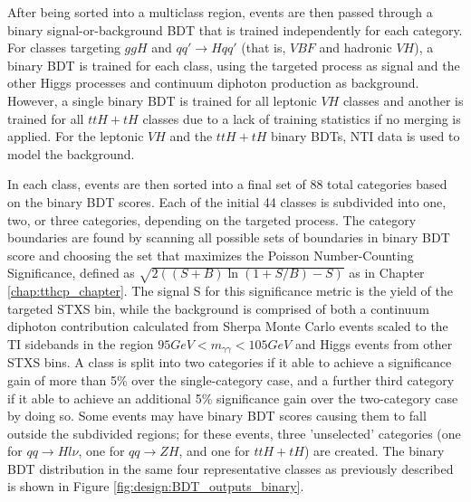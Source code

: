 After being sorted into a multiclass region, events are then passed through a binary signal-or-background BDT that is trained independently for each category. For classes targeting $ggH$ and $qq' \rightarrow Hqq'$ (that is, $VBF$ and hadronic $VH$), a binary BDT is trained for each class, using the targeted process as signal and the other Higgs processes and continuum diphoton production as background. However, a single binary BDT is trained for all leptonic $VH$ classes and another is trained for all $ttH+tH$ classes due to a lack of training statistics if no merging is applied. For the leptonic $VH$ and the $ttH+tH$ binary BDTs, NTI data is used to model the background.

In each class, events are then sorted into a final set of 88 total categories based on the binary BDT scores. Each of the initial 44 classes is subdivided into one, two, or three categories, depending on the targeted process. The category boundaries are found by scanning all possible sets of boundaries in binary BDT score and choosing the set that maximizes the Poisson Number-Counting Significance, defined as $\sqrt{2((S+B)\ln(1+S/B)-S)}$ as in Chapter \ref{chap:tthcp_chapter}. The signal S for this significance metric is the yield of the targeted STXS bin, while the background is comprised of both a continuum diphoton contribution calculated from Sherpa Monte Carlo events scaled to the TI sidebands in the region $95 GeV < m_{\gamma \gamma} < 105 GeV$ and Higgs events from other STXS bins. A class is split into two categories if it able to achieve a significance gain of more than 5\% over the single-category case, and a further third category if it able to achieve an additional 5\% significance gain over the two-category case by doing so. Some events may have binary BDT scores causing them to fall outside the subdivided regions; for these events, three 'unselected' categories (one for $qq \rightarrow H l \nu$, one for $qq \rightarrow ZH$, and one for $ttH+tH$) are created. The binary BDT distribution in the same four representative classes as previously described is shown in Figure \ref{fig:design:BDT_outputs_binary}.


